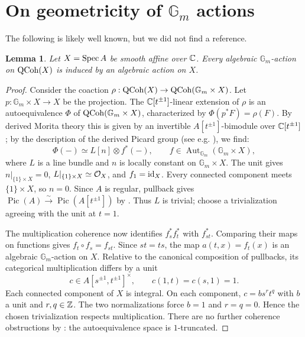 \documentclass[12pt, letter]{amsart}
\newtheorem{lemma}[dummy]{Lemma}
\theoremstyle{definition}
\begin{document}
\section{On geometricity of  $\mathbb{G}_m$ actions}

The following is likely well known, but we did not find a reference.  

\begin{lemma}\label{lem:gm-action-geometric}
Let $X=\operatorname{Spec} A$ be smooth affine over $\mathbb{C}$.
Every algebraic $\mathbb G_m$-action on $\operatorname{QCoh}(X)$ is induced by an algebraic action on $X$.
\end{lemma}

\begin{proof}
Consider the coaction $
 \rho:\operatorname{QCoh}(X)\to\operatorname{QCoh}(\mathbb G_m\times X)$.
Let $p:\mathbb G_m\times X\to X$ be the projection.
The $\mathbb{C}[t^{\pm1}]$-linear extension of $\rho$ is an autoequivalence $\Phi$ of $\operatorname{QCoh}(\mathbb G_m\times X)$, characterized by $\Phi(p^*F)=\rho(F)$.  By derived Morita theory \cite[Theorem~8.9]{Toen-Morita} this is given by an invertible $A[t^{\pm1}]$-bimodule over $\mathbb{C}[t^{\pm1}]$; by the description of the derived Picard group (see e.g. \cite[Corollary~5.7]{Negron-DPic}), we find:
\[
 \Phi(-)\simeq L[n]\otimes f^*(-),
 \qquad f\in\operatorname{Aut}_{\mathbb G_m}(\mathbb G_m\times X),
\]
where $L$ is a line bundle and $n$ is locally constant on $\mathbb G_m\times X$.
The unit gives $n|_{\{1\}\times X}=0$, $L|_{\{1\}\times X}\simeq\mathcal{O}_X$, and $f_1=\mathrm{id}_X$.
Every connected component meets $\{1\}\times X$, so $n=0$.
Since $A$ is regular, pullback gives $
 \operatorname{Pic}(A)\xrightarrow{\sim}\operatorname{Pic}(A[t^{\pm1}])$
by \cite[Remark~1.5.2]{Weibel-Pic}.
Thus $L$ is trivial; choose a trivialization agreeing with the unit at $t=1$.

The multiplication coherence now identifies $f_s^*f_t^*$ with $f_{st}^*$.
Comparing their maps on functions gives $f_t\circ f_s=f_{st}$.
Since $st=ts$, the map $a(t,x)=f_t(x)$ is an algebraic $\mathbb G_m$-action on $X$.
Relative to the canonical composition of pullbacks, its categorical multiplication differs by a unit
\[
 c\in A[s^{\pm1},t^{\pm1}]^\times,
 \qquad c(1,t)=c(s,1)=1.
\]
Each connected component of $X$ is integral.
On each component, $c=b s^r t^q$ with $b$ a unit and $r,q\in\mathbb{Z}$.
The two normalizations force $b=1$ and $r=q=0$.
Hence the chosen trivialization respects multiplication.
There are no further coherence obstructions by \cite[Corollary~8.13]{Toen-Morita}: the autoequivalence space is $1$-truncated.
\end{proof}
\end{document}
